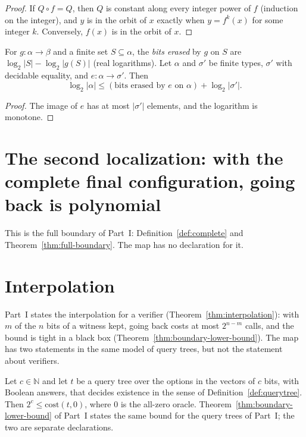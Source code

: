 \begin{proof}
  \leanok
  If $Q \circ f = Q$, then $Q$ is constant along every integer power of $f$ (induction on the
  integer), and $y$ is in the orbit of $x$ exactly when $y = f^k(x)$ for some integer $k$. Conversely,
  $f(x)$ is in the orbit of $x$.
\end{proof}

\begin{theorem}
  \label{thm:arrow-erase-or-keep}
  \leanok
  For $g : \alpha \to \beta$ and a finite set $S \subseteq \alpha$, the \emph{bits erased} by $g$ on
  $S$ are $\log_2 |S| - \log_2 |g(S)|$ (real logarithms). Let $\alpha$ and $\sigma'$ be finite types,
  $\sigma'$ with decidable equality, and $e : \alpha \to \sigma'$. Then
  \[
    \log_2 |\alpha| \le (\text{bits erased by } e \text{ on } \alpha) + \log_2 |\sigma'|.
  \]
  \own{}
\end{theorem}

\begin{proof}
  \leanok
  The image of $e$ has at most $|\sigma'|$ elements, and the logarithm is monotone.
\end{proof}

\section{The second localization: with the complete final configuration, going back is polynomial}
\label{sec:arrow-loc2}

This is the full boundary of Part~I: Definition~\ref{def:complete} and
Theorem~\ref{thm:full-boundary}. The map has no declaration for it.

\section{Interpolation}
\label{sec:arrow-interp}

Part~I states the interpolation for a verifier (Theorem~\ref{thm:interpolation}): with $m$ of the $n$
bits of a witness kept, going back costs at most $2^{n-m}$ calls, and the bound is tight in a black
box (Theorem~\ref{thm:boundary-lower-bound}). The map has two statements in the same model of
query trees, but not the statement about verifiers.

\begin{theorem}
  \label{thm:arrow-branches}
  \leanok
  Let $c \in \mathbb{N}$ and let $t$ be a query tree over the options in the vectors of $c$ bits, with
  Boolean answers, that decides existence in the sense of Definition~\ref{def:querytree}. Then
  $2^c \le \mathrm{cost}(t, 0)$, where $0$ is the all-zero oracle. Theorem~\ref{thm:boundary-lower-bound}
  of Part~I states the same bound for the query trees of Part~I; the two are separate declarations.
  \own{}
\end{theorem}


